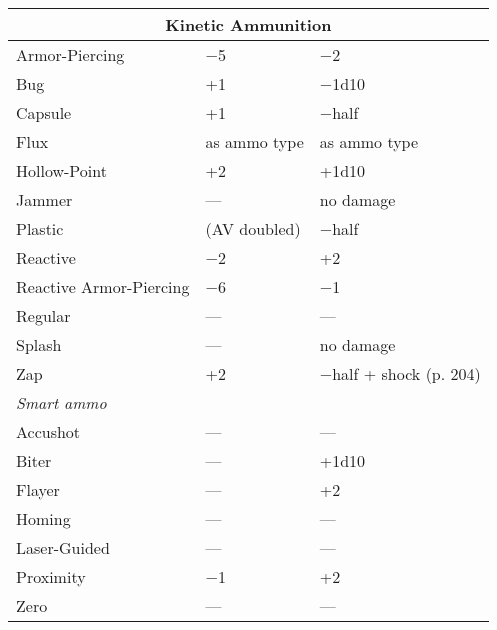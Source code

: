 \begin{table} \begin{tabular}{|l|l|l|} \hline

\multicolumn{3}{|c|}{\textbf{Kinetic Ammunition}} \\ \hline

Armor-Piercing	&$-$5	&$-$2 \\ \hline

Bug	&+1	&$-$1d10 \\ \hline

Capsule	&+1	&$-$half \\ \hline

Flux	&as ammo type	&as ammo type \\ \hline

Hollow-Point	&+2	&+1d10 \\ \hline

Jammer	&--- &no damage \\ \hline

Plastic	&(AV doubled)	&$-$half \\ \hline

Reactive	&$-$2	&+2 \\ \hline

Reactive Armor-Piercing	&$-$6	&$-$1 \\ \hline

Regular	&--- &--- \\ \hline

Splash	&--- &no damage \\ \hline

Zap	&+2	&$-$half + shock (p. 204) \\ \hline

\multicolumn{3}{|l|}{\emph{Smart ammo}} \\ \hline

Accushot	&--- &--- \\ \hline

Biter	&--- &+1d10 \\ \hline

Flayer	&--- &+2 \\ \hline

Homing	&--- &--- \\ \hline

Laser-Guided	&--- &--- \\ \hline

Proximity	&$-$1	&+2 \\ \hline

Zero	&--- &--- \\ \hline

\end{tabular} \label{tab:kinetic-ammo} \end{table} 



